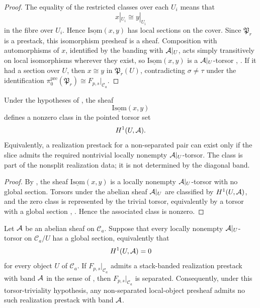 \begin{proof}
The equality of the restricted classes over each $U_i$ means that
\[
x|_{U_i}\cong y|_{U_i}
\]
in the fibre over $U_i$. Hence $\underline{\mathrm{Isom}}(x,y)$ has local sections on the cover. Since $\mathfrak P_r$ is a prestack, this isomorphism presheaf is a sheaf. Composition with automorphisms of $x$, identified by the banding with $\mathcal{A}|_U$, acts simply transitively on local isomorphisms wherever they exist, so $\underline{\mathrm{Isom}}(x,y)$ is a $\mathcal{A}|_U$-torsor \cite[Chap.~III]{MacLaneMoerdijk1994}, \cite[Sec.~11]{StacksProject}. If it had a section over $U$, then $x\cong y$ in $\mathfrak P_r(U)$, contradicting $\sigma\neq\tau$ under the identification $\pi_0^{\mathrm{pre}}(\mathfrak P_r)\cong F_{p,s}|_{\mathcal C_a}$.
\end{proof}

\begin{corollary}\label{cor:nonseparated-forces-h1-class}
Under the hypotheses of , the sheaf
\[
\underline{\mathrm{Isom}}(x,y)
\]
defines a nonzero class in the pointed torsor set
\[
H^1(U,\mathcal{A}).
\]
Equivalently, a realization prestack for a non-separated pair can exist only if
the slice admits the required nontrivial locally nonempty $\mathcal{A}|_U$-torsor. The
class is part of the nonsplit realization data; it is not determined by the
diagonal band.
\end{corollary}

\begin{proof}
By , the sheaf
$\underline{\mathrm{Isom}}(x,y)$ is a locally nonempty $\mathcal{A}|_U$-torsor with no
global section. Torsors under the abelian sheaf $\mathcal{A}|_U$ are classified by
$H^1(U,\mathcal{A})$, and the zero class is represented by the trivial torsor,
equivalently by a torsor with a global section
\cite[Chap.~III]{MacLaneMoerdijk1994}, \cite[Sec.~11]{StacksProject}. Hence the
associated class is nonzero.
\end{proof}

\begin{corollary}\label{cor:band-does-not-force-realization}
Let $\mathcal{A}$ be an abelian sheaf on $\mathcal C_a$. Suppose that every locally nonempty $\mathcal{A}|_U$-torsor on $\mathcal C_a/U$ has a global section, equivalently that
\[
H^1(U,\mathcal{A})=0
\]
for every object $U$ of $\mathcal C_a$. If $F_{p,s}|_{\mathcal C_a}$ admits a
stack-banded realization prestack with band $\mathcal{A}$ in the sense of
, then $F_{p,s}|_{\mathcal C_a}$ is separated.
Consequently, under this torsor-triviality hypothesis, any non-separated
local-object presheaf admits no such realization prestack with band $\mathcal{A}$.
\end{corollary}

